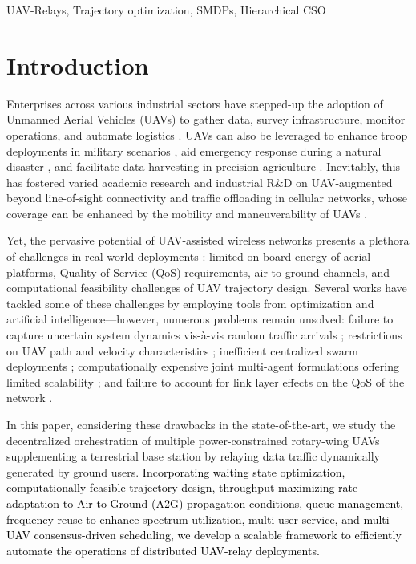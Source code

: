 \documentclass[12pt, draftcls, onecolumn]{IEEEtran}
\theoremstyle{plain}
\theoremstyle{definition}
\theoremstyle{remark}
\newcommand\hlt[1]{\textcolor{black}{#1}}
\begin{document}
\begin{IEEEkeywords}
\begin{center}
    UAV-Relays, Trajectory optimization, SMDPs, Hierarchical CSO
\end{center}
\end{IEEEkeywords}
\vspace{-4mm}

\section{Introduction}\label{S1}
Enterprises across various industrial sectors have stepped-up the adoption of Unmanned Aerial Vehicles (UAVs) to gather data, survey infrastructure, monitor operations, and automate logistics \cite{UAVSurvey, UAVTutorial}.
UAVs can also be leveraged to enhance troop deployments in military scenarios \cite{TCCN}, aid emergency response during a natural disaster \cite{VerizonDisasterRelief}, and facilitate data harvesting in precision agriculture \cite{VerizonAgriculture}. Inevitably, this has fostered varied academic research and industrial R\&D on UAV-augmented beyond line-of-sight connectivity and traffic offloading in cellular networks, whose coverage can be enhanced by the mobility and maneuverability of UAVs \cite{LOSDominance, FundamentalTradeoffs}. 

Yet, the pervasive potential of UAV-assisted wireless networks presents a plethora of challenges in real-world deployments \cite{FundamentalTradeoffs}: limited on-board energy of aerial platforms, Quality-of-Service (QoS) requirements, air-to-ground channels, and computational feasibility challenges of UAV trajectory design. Several works have tackled some of these challenges by employing tools from optimization and artificial intelligence---however, numerous problems remain unsolved: failure to capture uncertain system dynamics vis-\`{a}-vis random traffic arrivals \cite{SCA, PAoI, MEC-CVX, LoSMap, Rician}; restrictions on UAV path and velocity characteristics \cite{PSOPathStructure, PAoI}; inefficient centralized swarm deployments \cite{CSCA-ADMM, JointTrajectoryDesign, MultiDroneDeployment}; computationally expensive joint multi-agent formulations offering limited scalability \cite{DDQN, MEC-DDPG, DQNPositioning, MLDeployment}; and failure to account for link layer effects on the QoS of the network \cite{GameTheory, UAVDynamicCoverage}.

In this paper, considering these drawbacks in the state-of-the-art, we study the decentralized orchestration of multiple power-constrained rotary-wing UAVs supplementing a terrestrial base station by relaying data traffic dynamically generated by ground users. \hlt{Incorporating waiting state optimization, computationally feasible trajectory design, throughput-maximizing rate adaptation to Air-to-Ground (A2G) propagation conditions, queue management, frequency reuse to enhance spectrum utilization, multi-user service, and multi-UAV consensus-driven scheduling, we develop a scalable framework to efficiently automate the operations of distributed UAV-relay deployments.}
\end{document}
